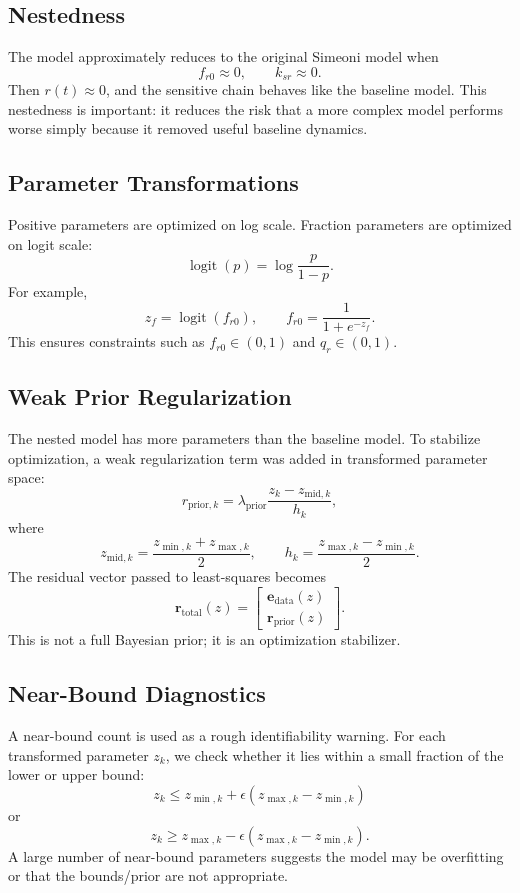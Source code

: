 \documentclass[11pt,a4paper]{article}
\begin{document}
\subsection{Nestedness}

The model approximately reduces to the original Simeoni model when
\[
    f_{r0}\approx 0,
    \qquad
    k_{sr}\approx 0.
\]
Then $r(t)\approx 0$, and the sensitive chain behaves like the baseline model. This nestedness is important: it reduces the risk that a more complex model performs worse simply because it removed useful baseline dynamics.

\subsection{Parameter Transformations}

Positive parameters are optimized on log scale. Fraction parameters are optimized on logit scale:
\[
    \operatorname{logit}(p)=\log\frac{p}{1-p}.
\]
For example,
\[
    z_{f} = \operatorname{logit}(f_{r0}),
    \qquad
    f_{r0}=\frac{1}{1+e^{-z_f}}.
\]
This ensures constraints such as $f_{r0}\in(0,1)$ and $q_r\in(0,1)$.

\subsection{Weak Prior Regularization}

The nested model has more parameters than the baseline model. To stabilize optimization, a weak regularization term was added in transformed parameter space:
\[
    r_{\mathrm{prior},k}
    = \lambda_{\mathrm{prior}}
    \frac{z_k-z_{\mathrm{mid},k}}{h_k},
\]
where
\[
    z_{\mathrm{mid},k}=\frac{z_{\min,k}+z_{\max,k}}{2},
    \qquad
    h_k=\frac{z_{\max,k}-z_{\min,k}}{2}.
\]
The residual vector passed to least-squares becomes
\[
    \mathbf{r}_{\mathrm{total}}(z)
    =
    \begin{bmatrix}
    \mathbf{e}_{\mathrm{data}}(z)\\
    \mathbf{r}_{\mathrm{prior}}(z)
    \end{bmatrix}.
\]
This is not a full Bayesian prior; it is an optimization stabilizer.

\subsection{Near-Bound Diagnostics}

A near-bound count is used as a rough identifiability warning. For each transformed parameter $z_k$, we check whether it lies within a small fraction of the lower or upper bound:
\[
    z_k \leq z_{\min,k}+\epsilon(z_{\max,k}-z_{\min,k})
\]
or
\[
    z_k \geq z_{\max,k}-\epsilon(z_{\max,k}-z_{\min,k}).
\]
A large number of near-bound parameters suggests the model may be overfitting or that the bounds/prior are not appropriate.
\end{document}

